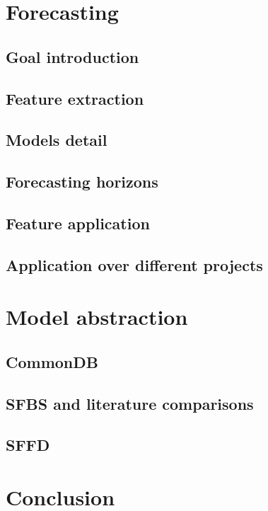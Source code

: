 \documentclass[%
    corpo=12pt,
    twoside,
    oldstyle,
    autoretitolo,
    greek,
    evenboxes,
]{toptesi}
\begin{document}

\chapter{Forecasting}
\section{Goal introduction}
\section{Feature extraction}
\section{Models detail}
\section{Forecasting horizons}
\section{Feature application}
\section{Application over different projects}



\chapter{Model abstraction}
\section{CommonDB}
\section{SFBS and literature comparisons}
\section{SFFD}



\chapter{Conclusion}





\end{document}
